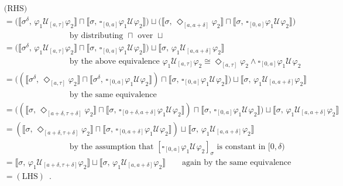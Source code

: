 \documentclass[envcountsect,orivec]{llncs} \usepackage{etex} \usepackage[]{graphicx}
\def\myqed{\qed}
\newcommand{\UntilOp}[1]{\mathbin{\mathcal{U}_{#1}}}
\newcommand{\DiaOp}[1]{\Diamond_{#1}}
\newcommand{\BoxOp}[1]{\square_{#1}}
\newcommand{\Robust}[2]{{ \llbracket #1,\, #2 \rrbracket}}
\begin{document}
\begin{myproof}
  \begin{align*} 
&\textrm{(RHS)} 
\\
    &=  \bigl(\Robust{\sigma^\delta}{\varphi_1 \UntilOp{[a, \tau]} \varphi_2} 
      \sqcap \Robust{\sigma}{\BoxOp{[0,a]} \varphi_1 \UntilOp{} \varphi_2}\bigr)
      \sqcup
      \bigl(\Robust{\sigma}{\DiaOp{[a, a+\delta]}{\varphi_2}}
      \sqcap \Robust{\sigma}{\BoxOp{[0,a]} \varphi_1 \UntilOp{}
   \varphi_2}\bigr)
\\
   &\qquad\qquad\qquad\qquad
    \text{by distributing $\sqcap$ over $\sqcup$}
\\
      &=  \bigl(\Robust{\sigma^\delta}{\varphi_1 \UntilOp{[a, \tau]} \varphi_2} 
      \sqcap \Robust{\sigma}{\BoxOp{[0,a]} \varphi_1 \UntilOp{} \varphi_2}\bigr)
      \sqcup \Robust{\sigma}{\varphi_1 \UntilOp{[a, a+\delta]}
   \varphi_2}
\\
   &\qquad\qquad\qquad\qquad
    \text{by the above equivalence $\varphi_1 \UntilOp{[a, \tau]} \varphi_2 \cong 
\DiaOp{[a, \tau]} \varphi_2 \wedge \BoxOp{[0,a]} \varphi_1 \UntilOp{}
\varphi_2$} 
\\
       &= 
          \big((
          \Robust{\sigma^\delta}{\DiaOp{[a, \tau]} \varphi_2} 
          \sqcap \Robust{\sigma^\delta}{\BoxOp{[0,a]} \varphi_1 \UntilOp{} \varphi_2})
          \sqcap \Robust{\sigma}{\BoxOp{[0,a]} \varphi_1 \UntilOp{} \varphi_2} \big)
          \sqcup \Robust{\sigma}{\varphi_1 \UntilOp{[a, a+\delta]} \varphi_2}
\\
   &\qquad\qquad\qquad\qquad
    \text{by the same equivalence} 
\\
       &= 
          \big((
          \Robust{\sigma}{\DiaOp{[a+\delta, \tau+\delta]} \varphi_2} 
          \sqcap \Robust{\sigma}{\BoxOp{[0+\delta,a+\delta]} \varphi_1 \UntilOp{} \varphi_2})
          \sqcap \Robust{\sigma}{\BoxOp{[0,a]} \varphi_1 \UntilOp{} \varphi_2} \big)
          \sqcup \Robust{\sigma}{\varphi_1 \UntilOp{[a, a+\delta]} \varphi_2}
\\
   &= (
        \Robust{\sigma}{\DiaOp{[a+\delta, \tau+\delta]} \varphi_2} 
        \sqcap \Robust{\sigma}{\BoxOp{[0,a+\delta]} \varphi_1 \UntilOp{} \varphi_2})
        \sqcup \Robust{\sigma}{\varphi_1 \UntilOp{[a, a+\delta]}
   \varphi_2}
\\
   &\qquad\qquad\qquad\qquad
    \text{by the assumption that $[\BoxOp{[0,a]}\varphi_{1}\UntilOp{} \varphi_{2}]_{\sigma}$ is constant
 in  $[0,\delta)$} 
\\
     &=
        \Robust{\sigma}{\varphi_1 \UntilOp{[a+\delta, \tau+\delta]} \varphi_2}
        \sqcup \Robust{\sigma}{\varphi_1 \UntilOp{[a, a+\delta]}
   \varphi_2}\qquad
    \text{again by the same equivalence} 
\\
     &= (\mathrm{LHS})\enspace. \tag*{\myqed}
  \end{align*}
\end{myproof}
\end{document}
